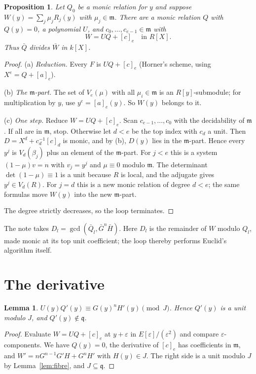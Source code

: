 \documentclass[11pt]{amsart}
\numberwithin{equation}{section}
\newtheorem{proposition}[theorem]{Proposition}
\newtheorem{lemma}[theorem]{Lemma}
\theoremstyle{definition}
\theoremstyle{remark}
\newcommand{\m}{\mathfrak m}
\newcommand{\q}{\mathfrak q}
\begin{document}
\begin{proposition}\label{prop:loop}
Let $Q_0$ be a monic relation for $y$ and suppose
$W(y)=\sum_j\mu_jR_j(y)$ with $\mu_j\in\m$. There are a monic relation
$Q$ with $Q(y)=0$, a polynomial $U$, and $c_0,\ldots,c_{e-1}\in\m$ with
\[
 W=UQ+[c]_e\quad\text{in }R[X].
\]
Thus $\bar Q$ divides $\bar W$ in $k[X]$.
\end{proposition}
\begin{proof}
(a) \emph{Reduction.} Every $F$ is $UQ+[c]_e$ (Horner's scheme, using
$X^e=Q+[a]_e$).

(b) \emph{The $\m$-part.} The set of $V_e(\mu)$ with all $\mu_i\in\m$ is
an $R[y]$-submodule; for multiplication by $y$, use $y^e=[a]_e(y)$.
So $W(y)$ belongs to it.

(c) \emph{One step.} Reduce $W=UQ+[c]_e$. Scan $c_{e-1},\ldots,c_0$
with the decidability of $\m$. If all are in $\m$, stop. Otherwise let
$d<e$ be the top index with $c_d$ a unit. Then
$D=X^d+c_d^{-1}[c]_d$ is monic, and by (b), $D(y)$ lies in the
$\m$-part. Hence every $y^j$ is $V_d(\beta_j)$ plus an element of the
$\m$-part. For $j<e$ this is a system $(1-\mu)v=n$ with $v_j=y^j$ and
$\mu\equiv0$ modulo $\m$. The determinant $\det(1-\mu)\equiv1$ is a unit
because $R$ is local, and the adjugate gives $y^j\in V_d(R)$. For
$j=d$ this is a new monic relation of degree $d<e$; the same formulas
move $W(y)$ into the new $\m$-part.

The degree strictly decreases, so the loop terminates.
\end{proof}

The note takes $D_l=\gcd(\bar Q_l,\bar G^n\bar H)$. Here $D_l$ is the
remainder of $W$ modulo $Q_l$, made monic at its top unit coefficient;
the loop thereby performs Euclid's algorithm itself.

\section{The derivative}\label{sec:derivative}

\begin{lemma}\label{lem:derivative}
$U(y)Q'(y)\equiv G(y)^nH'(y)\pmod J$. Hence $Q'(y)$ is a unit modulo
$J$, and $Q'(y)\notin\q$.
\end{lemma}
\begin{proof}
Evaluate $W=UQ+[c]_e$ at $y+\varepsilon$ in $E[\varepsilon]/(\varepsilon^2)$
and compare $\varepsilon$-components. We have $Q(y)=0$, the derivative
of $[c]_e$ has coefficients in $\m$, and $W'=nG^{n-1}G'H+G^nH'$ with
$H(y)\in J$. The right side is a unit modulo $J$ by
Lemma~\ref{lem:fibre}, and $J\subseteq\q$.
\end{proof}
\end{document}
